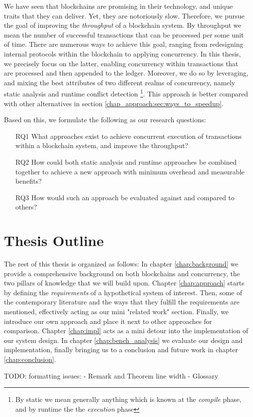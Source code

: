 We have seen that blockchains are promising in their technology, and unique traits that they can
deliver. Yet, they are notoriously slow. Therefore, we pursue the goal of improving the
\textit{throughput} of a blockchain system. By throughput we mean the number of successful
transactions that can be processed per some unit of time. There are numerous ways to
achieve this goal, ranging from redesigning internal protocols within the blockchain to applying
concurrency. In this thesis, we precisely focus on the latter, enabling concurrency within
transactions that are processed and then appended to the ledger. Moreover, we do so by leveraging,
and mixing the best attributes of two different realms of concurrency, namely static analysis and
runtime conflict detection \footnote{By static we mean generally anything which is known at the
\textit{compile} phase, and by runtime the the \textit{execution} phase}. This approach is better
compared with other alternatives in section \ref{chap_approach:sec:ways_to_speedup}.

Based on this, we formulate the following as our research questions:

 \begin{enumerate}
     \item [RQ1] What approaches exist to achieve concurrent execution of transactions within a
     blockchain system, and improve the throughput?
	 \item [RQ2] How could both static analysis and runtime approaches be combined together to
	 achieve a new approach with minimum overhead and measurable benefits?
	 \item [RQ3] How would such an approach be evaluated against and compared to others?
 \end{enumerate}

\section{Thesis Outline}
The rest of this thesis is organized as follows: In chapter \ref{chap:background} we provide a
comprehensive background on both blockchains and concurrency, the two pillars of knowledge that we
will build upon. Chapter \ref{chap:approach} starts by defining the \textit{requirements} of a
hypothetical system of interest. Then, some of the contemporary literature and the ways that they
fulfill the requirements are mentioned, effectively acting as our mini "related work" section.
Finally, we introduce our own approach and place it next to other approaches for comparison. Chapter
\ref{chap:impl} acts as a mini detour into the implementation of our system design. In chapter
\ref{chap:bench_analysis} we evaluate our design and implementation, finally bringing us to a
conclusion and future work in chapter \ref{chap:conclusion}.

TODO: formatting issues:
- Remark and Theorem line width
- Glossary

